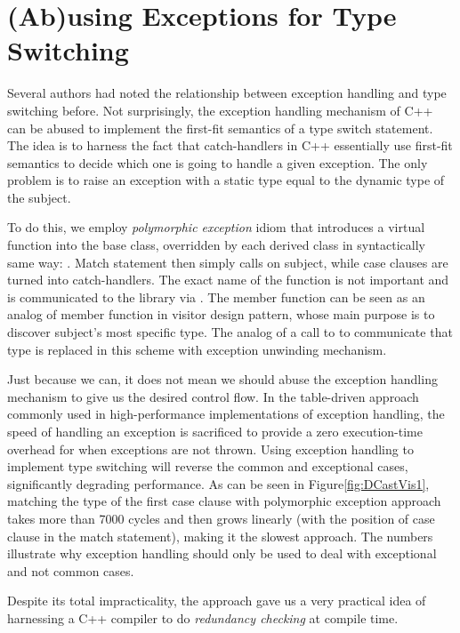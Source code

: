 \section{(Ab)using Exceptions for Type Switching}
\label{sec:xpm}

Several authors had noted the relationship between exception handling and type 
switching before\cite{Glew99,ML2000}. Not surprisingly, the exception handling 
mechanism of C++ can be abused to implement the first-fit semantics of a type 
switch statement. The idea is to harness the fact that catch-handlers in C++ 
essentially use first-fit semantics to decide which one is going to handle a 
given exception. The only problem is to raise an exception with a static type 
equal to the dynamic type of the subject.

To do this, we employ \emph{polymorphic exception} idiom\cite{PolyExcept} that 
introduces a virtual function  into the 
base class, overridden by each derived class in syntactically same way: 
. Match statement then simply calls  on subject, 
while case clauses are turned into catch-handlers. The exact name of the 
function is not important and is communicated to the library via 
. The  member function can be seen as an analog of 
 member function in visitor design pattern, whose main purpose is 
to discover subject's most specific type. The analog of a call to  
to communicate that type is replaced in this scheme with exception unwinding 
mechanism.

Just because we can, it does not mean we should abuse the exception handling 
mechanism to give us the desired control flow. In the table-driven approach 
commonly used in high-performance implementations of exception handling, the 
speed of handling an exception is sacrificed to provide a zero execution-time 
overhead for when exceptions are not thrown\cite{Schilling98}. Using exception 
handling to implement type switching will reverse the common and exceptional 
cases, significantly degrading performance. As can be seen in 
Figure\ref{fig:DCastVis1}, matching the type of the first case clause with 
polymorphic exception approach takes more than 7000 cycles and then grows 
linearly (with the position of case clause in the match statement), making it the 
slowest approach. The numbers illustrate why exception handling should only be 
used to deal with exceptional and not common cases.

Despite its total impracticality, the approach gave us a very practical idea of 
harnessing a C++ compiler to do \emph{redundancy checking} at compile time.

